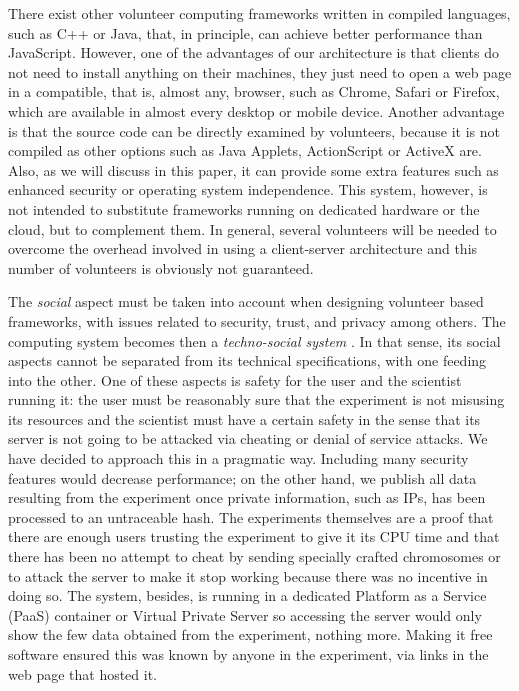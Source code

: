 \documentclass{sig-alternate}
\begin{document}
There exist other volunteer computing frameworks written in compiled languages,
such as C++ or Java, that, in principle, can achieve better performance than
JavaScript. However, one of the advantages of our architecture is that
clients do not need to install anything on their machines, they just
need to open a web page  
in a compatible, that is, almost any, browser, such as Chrome, Safari or  Firefox, which are
available in almost every desktop or mobile device. Another advantage is
that the source code can be directly examined by volunteers, because it is not
compiled as other options such as Java Applets, ActionScript or
ActiveX are. Also, as we will discuss in this paper, it can provide some extra
features such as enhanced security or operating system
independence. This system, however, is not intended to substitute
frameworks running on dedicated hardware or the cloud, but to
complement them. In general, several volunteers will be needed to
overcome the overhead involved in using a client-server architecture
and this number of volunteers is obviously not guaranteed. 


The {\em social} aspect must be taken into account when designing 
volunteer based frameworks, with 
issues related to security, trust, and privacy among others. 
The computing system becomes then a {\em techno-social system}
\cite{vespignani2009predicting}. In that sense, its social aspects
cannot be separated from its technical specifications, with one
feeding into the other. One of these aspects is safety for the user
and the scientist running it: the user must be reasonably sure that the
experiment is not misusing its resources and the scientist must have a
certain safety in the sense that its server is not going to be
attacked via cheating or denial of service attacks. We have decided to
approach this in a pragmatic way. Including many security features
would decrease performance; on the other hand, we publish all data
resulting from the experiment once private information, such as IPs,
has been processed to an untraceable hash. The experiments themselves
are a proof that there are enough users trusting the experiment to
give it its CPU time and that there has been no attempt to cheat by
sending specially crafted chromosomes or to attack the server to make
it stop working because there was no incentive in doing so. The
system, besides, is running in a dedicated Platform as a Service (PaaS)
container or Virtual Private Server so accessing the server would only
show the few data obtained from the experiment, nothing more. Making it
free software ensured this was known by anyone in the experiment, via
links in the web page that hosted it.
\end{document}
